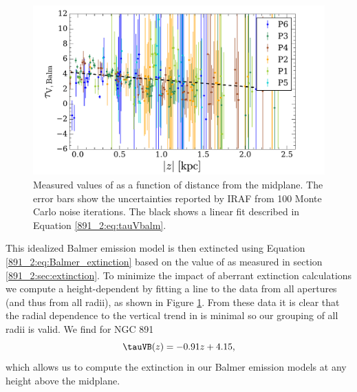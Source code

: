 
\begin{figure}
  \centering
  \includegraphics[width=\columnwidth]{891_2/figs/TauV_balm.pdf}
  \caption[Height dependence of
    \tauVB]{\fixspacing\label{891_2:fig:tauVB_height}Measured values
    of \tauVB as a function of distance from the midplane. The error
    bars show the uncertainties reported by IRAF from 100 Monte Carlo
    noise iterations. The black shows a linear fit described in
    Equation \ref{891_2:eq:tauVbalm}.}
\end{figure}

This idealized Balmer emission model is then extincted using Equation
\ref{891_2:eq:Balmer_extinction} based on the value of \tauVB as measured in
section \ref{891_2:sec:extinction}. To minimize the impact of aberrant
extinction calculations we compute a height-dependent \tauVB by
fitting a line to the data from all apertures (and thus from all
radii), as shown in Figure \ref{891_2:fig:tauVB_height}. From these data it
is clear that the radial dependence to the vertical trend in \tauVB is
minimal so our grouping of all radii is valid. We find for NGC 891
\begin{equation}
\label{891_2:eq:tauVbalm}
  \tauVB (z) = -0.91 z + 4.15,
\end{equation}
which allows us to compute the extinction in our Balmer emission
models at any height above the midplane.

